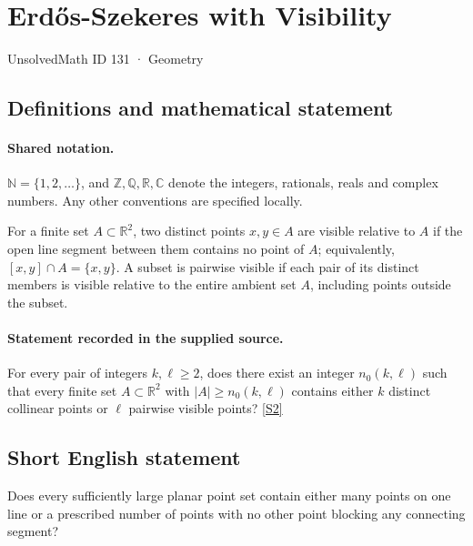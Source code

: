 \documentclass[11pt]{article}
\newcommand{\sref}[2]{\hyperlink{source:#1:#2}{[S#2]}}
\begin{document}
\setcounter{section}{130}
\section{Erdős-Szekeres with Visibility}\label{131}
{\small\sffamily UnsolvedMath ID 131 · Geometry}
\subsection{Definitions and mathematical statement}

\paragraph{Shared notation.}$\mathbb N=\{1,2,\ldots\}$, and $\mathbb Z,\mathbb Q,\mathbb R,\mathbb C$ denote the integers, rationals, reals and complex numbers. Any other conventions are specified locally.


For a finite set $A\subset\mathbb R^2$, two distinct points $x,y\in A$ are visible relative to $A$ if the open line segment between them contains no point of $A$; equivalently, $[x,y]\cap A=\{x,y\}$. A subset is pairwise visible if each pair of its distinct members is visible relative to the entire ambient set $A$, including points outside the subset.
\paragraph{Statement recorded in the supplied source.}
For every pair of integers $k,\ell\geq2$, does there exist an integer $n_0(k,\ell)$ such that every finite set $A\subset\mathbb R^2$ with $|A|\geq n_0(k,\ell)$ contains either $k$ distinct collinear points or $\ell$ pairwise visible points? \sref{131}{2}
\subsection{Short English statement}
Does every sufficiently large planar point set contain either many points on one line or a prescribed number of points with no other point blocking any connecting segment?
\end{document}
